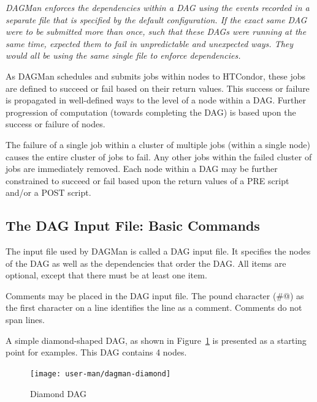\emph{DAGMan enforces the dependencies within a DAG
using the events recorded in a separate
file that is specified by the default configuration.
If the exact same DAG were to be submitted more than once,
such that these DAGs were running at the same time,
expected them to fail in unpredictable and unexpected ways.
They would all be using the same single file to enforce dependencies. }

As DAGMan schedules and submits jobs within nodes to HTCondor,
these jobs are defined to succeed or fail based on their
return values.
This success or failure is propagated in well-defined ways to the level of
a node within a DAG.
Further progression of computation
(towards completing the DAG)
is based upon the success or failure of nodes.

The failure of a single job within a cluster
of multiple jobs
(within a single node)
causes the entire cluster of jobs to fail.
Any other jobs within the failed cluster of jobs are
immediately removed.
Each node within a DAG may be further constrained  to succeed or fail
based upon the return values of a PRE script and/or a POST script.

\subsection{The DAG Input File: Basic Commands}

The input file used by DAGMan is called a DAG input file.
It specifies the nodes of the DAG as well as the dependencies
that order the DAG.
All items are optional, except that there must be at least one 
item.

Comments may be placed in the DAG input file.
The pound character (\verb@#@) as the first character on a
line identifies the line as a comment.
Comments do not span lines.

A simple diamond-shaped DAG, as shown in
Figure~\ref{fig:dagman-diamond}
is presented as a starting point for examples.
This DAG contains 4 nodes.

\begin{figure}[hbt]
\centering
\texttt{[image: user-man/dagman-diamond]}





\caption{\label{fig:dagman-diamond}Diamond DAG}
\end{figure}


